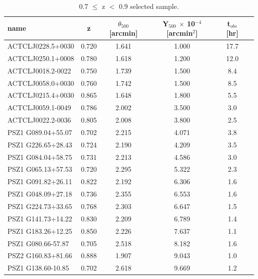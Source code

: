 \documentclass[11pt,a4paper,twoside,graphicx,color]{article}
\begin{document}
\begin{table}
\centering
\begin{tabular}{|l  || c  | c | c | c | c | }
  \hline                       
name  &   z  & $\theta_{500}$ [arcmin] & Y$_{500}$ $\times$ 10$^{-4}$ [arcmin$^{2}$] & t$_{obs}$ [hr] \\ \hline
   ACTCLJ0228.5+0030 & 0.720 & 1.641 & 1.000 & 17.7 \\ \hline
   ACTCLJ0250.1+0008 & 0.780 & 1.618 & 1.200 & 12.0 \\ \hline
   ACTCLJ0018.2-0022 & 0.750 & 1.739 & 1.500 & 8.4 \\ \hline
   ACTCLJ0058.0+0030 & 0.760 & 1.742 & 1.500 & 8.5 \\ \hline
   ACTCLJ0215.4+0030 & 0.865 & 1.648 & 1.800 & 5.5 \\ \hline
   ACTCLJ0059.1-0049 & 0.786 & 2.002 & 3.500 & 3.0 \\ \hline
   ACTCLJ0022.2-0036 & 0.805 & 2.008 & 3.800 & 2.5 \\ \hline
  PSZ1 G089.04+55.07 & 0.702 & 2.215 & 4.071 & 3.8 \\ \hline
  PSZ1 G226.65+28.43 & 0.724 & 2.190 & 4.209 & 3.5 \\ \hline
  PSZ1 G084.04+58.75 & 0.731 & 2.213 & 4.586 & 3.0 \\ \hline
  PSZ1 G065.13+57.53 & 0.720 & 2.295 & 5.322 & 2.3 \\ \hline
  PSZ1 G091.82+26.11 & 0.822 & 2.192 & 6.306 & 1.6 \\ \hline
  PSZ1 G048.09+27.18 & 0.736 & 2.355 & 6.553 & 1.6 \\ \hline
  PSZ1 G224.73+33.65 & 0.768 & 2.303 & 6.647 & 1.5 \\ \hline
  PSZ1 G141.73+14.22 & 0.830 & 2.209 & 6.789 & 1.4 \\ \hline
  PSZ1 G183.26+12.25 & 0.850 & 2.226 & 7.637 & 1.1 \\ \hline
  PSZ1 G080.66-57.87 & 0.705 & 2.518 & 8.182 & 1.6 \\ \hline
  PSZ2 G160.83+81.66 & 0.888 & 1.907 & 9.043 & 1.0 \\ \hline
  PSZ1 G138.60-10.85 & 0.702 & 2.618 & 9.669 & 1.2 \\ \hline
  \hline
\end{tabular}
 \caption{{\small 0.7 $\leq$ z $<$ 0.9 selected sample.}}
 \label{tab:z2_selected_sample}
\end{table}
\end{document}
